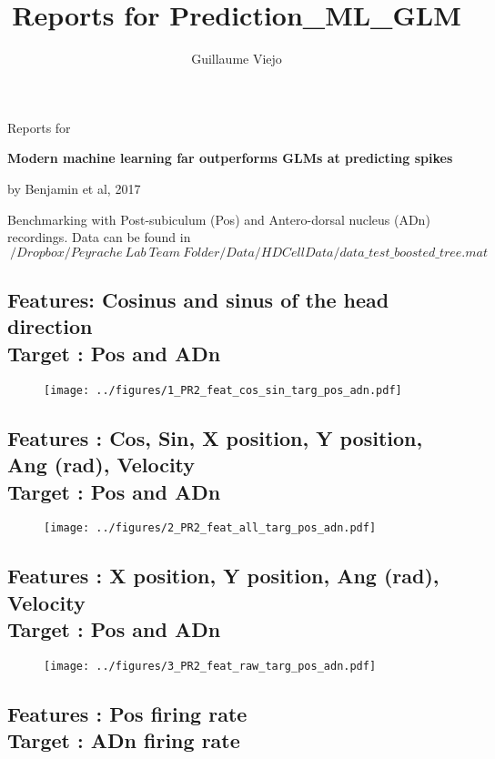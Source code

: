 \documentclass[10pt,a4paper]{article}
\author{Guillaume Viejo}
\title{Reports for Prediction_ML_GLM}
\begin{document}
Reports for 

\textbf{Modern machine learning far outperforms GLMs at predicting spikes} 

by Benjamin et al, 2017

Benchmarking with Post-subiculum (Pos) and Antero-dorsal nucleus (ADn) recordings. Data can be found in $~/Dropbox/Peyrache\ Lab\ Team\ Folder/Data/HDCellData/data\_test\_boosted\_tree.mat$

\tableofcontents

\subsection{Features: Cosinus and sinus of the head direction \\ Target : Pos and ADn}


\begin{figure}[htbp]
	\begin{center}
		\texttt{[image: ../figures/1\_PR2\_feat\_cos\_sin\_targ\_pos\_adn.pdf]} 
	\end{center}
\end{figure}

\subsection{Features : Cos, Sin, X position, Y position, Ang (rad), Velocity \\ Target : Pos and ADn}

\begin{figure}[htbp]
	\begin{center}
		\texttt{[image: ../figures/2\_PR2\_feat\_all\_targ\_pos\_adn.pdf]} 
	\end{center}
\end{figure}

\subsection{Features : X position, Y position, Ang (rad), Velocity \\ Target : Pos and ADn}

\begin{figure}[htbp]
	\begin{center}
		\texttt{[image: ../figures/3\_PR2\_feat\_raw\_targ\_pos\_adn.pdf]} 
	\end{center}
\end{figure}

\subsection{Features : Pos firing rate \\ Target : ADn firing rate}
\end{document}
